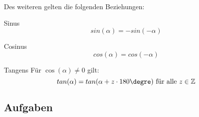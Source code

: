 Des weiteren gelten die folgenden Beziehungen:
\begin{gesetz}{Sinus}{}
  $$sin(\alpha) = - sin(-\alpha)$$
  \end{gesetz}
\begin{gesetz}{Cosinus}{}
  $$cos(\alpha) = cos(-\alpha)$$
  \end{gesetz}
\begin{gesetz}{Tangens}{}
  Für $\cos(\alpha)\ne 0$ gilt:
  $$tan(\alpha) = tan(\alpha + z\cdot{}180\degre) \textrm{ für alle } z\in\mathbb{Z}$$
  \end{gesetz}
\newpage



\subsection*{Aufgaben}
